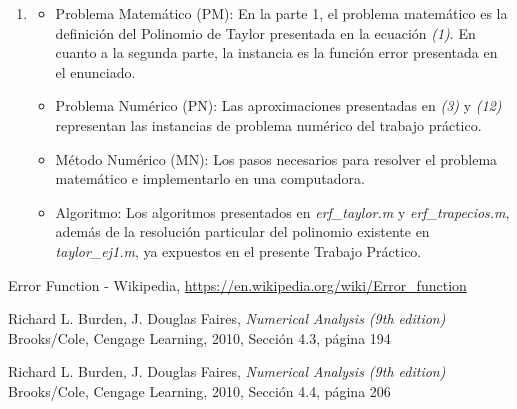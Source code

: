 \documentclass[titlepage,a4paper]{article}
\begin{document}
\begin{enumerate}[label=(\alph*)]
		\item
			\begin{itemize}
				\item Problema Matemático (PM): En la parte 1, el problema matemático es la definición del Polinomio de Taylor presentada en la ecuación \emph{(1)}. En cuanto a la segunda parte, la instancia es la función error presentada en el enunciado.
				\item Problema Numérico (PN): Las aproximaciones presentadas en \emph{(3)} y \emph{(12)} representan las instancias de problema numérico del trabajo práctico.
				\item Método Numérico (MN): Los pasos necesarios para resolver el problema matemático e implementarlo en una computadora.
				\item Algoritmo: Los algoritmos presentados en \textit{erf\_taylor.m} y \textit{erf\_trapecios.m}, además de la resolución particular del polinomio existente en \textit{taylor\_ej1.m}, ya expuestos en el presente Trabajo Práctico.
			\end{itemize}

	\end{enumerate}

\begin{thebibliography}{9} 
		Error Function - Wikipedia, \url{https://en.wikipedia.org/wiki/Error_function}
	
		Richard L. Burden, J. Douglas Faires, \emph{Numerical Analysis (9th edition)} \\
		Brooks/Cole, Cengage Learning, 2010, Sección 4.3, página 194

	Richard L. Burden, J. Douglas Faires, \emph{Numerical Analysis (9th edition)} \\
	Brooks/Cole, Cengage Learning, 2010, Sección 4.4, página 206
	 
\end{thebibliography}
\end{document}
